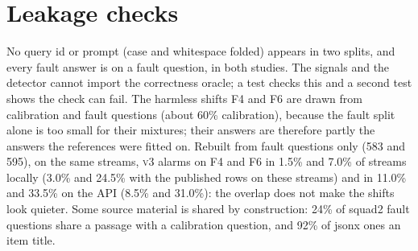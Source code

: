 \documentclass{article}
\newcommand{\vthree}{\textsc{v3}}
\begin{document}
\section{Leakage checks}
\label{app:leak}
No query id or prompt (case and whitespace folded) appears in two splits, and every
fault answer is on a fault question, in both studies. The signals and the detector
cannot import the correctness oracle; a test checks this and a second test shows
the check can fail. The harmless shifts F4 and F6 are drawn from calibration and
fault questions (about 60\% calibration), because the fault split alone is too small
for their mixtures; their answers are therefore partly the answers the references
were fitted on. Rebuilt from fault questions only (583 and 595), on the same
streams, \vthree{} alarms on F4 and F6 in 1.5\% and 7.0\% of streams locally
(3.0\% and 24.5\% with the published rows on these streams) and in 11.0\% and 33.5\% on the API
(8.5\% and 31.0\%): the overlap does not make the shifts look quieter. Some source
material is shared by construction: 24\% of \textsf{squad2} fault questions share
a passage with a calibration question, and 92\% of \textsf{jsonx} ones an item
title.
\end{document}
